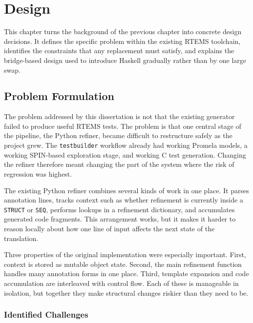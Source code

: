 \chapter{Design}
\label{chap:Design}


This chapter turns the background of the previous chapter into
concrete design decisions. It defines the specific problem within the
existing RTEMS toolchain, identifies the constraints that any
replacement must satisfy, and explains the bridge-based design used to
introduce Haskell gradually rather than by one large swap.

\section{Problem Formulation}
\label{sec:ProblemFormulation}

The problem addressed by this dissertation is not that the existing
generator failed to produce useful RTEMS tests. The problem is that
one central stage of the pipeline, the Python refiner, became
difficult to restructure safely as the project grew. The
\texttt{testbuilder} workflow already had working Promela models, a
working SPIN-based exploration stage, and working C test generation.
Changing the refiner therefore meant changing the part of the system
where the risk of regression was highest.

The existing Python refiner combines several kinds of work in one
place. It parses annotation lines, tracks context such as whether
refinement is currently inside a \texttt{STRUCT} or \texttt{SEQ},
performs lookups in a refinement dictionary, and accumulates generated
code fragments. This arrangement works, but it makes it harder to
reason locally about how one line of input affects the next state of
the translation.

Three properties of the original implementation were especially
important. First, context is stored as mutable object state. Second,
the main refinement function handles many annotation forms in one
place. Third, template expansion and code accumulation are interleaved
with control flow. Each of these is manageable in isolation, but
together they make structural changes riskier than they need to be.

\subsection{Identified Challenges}

